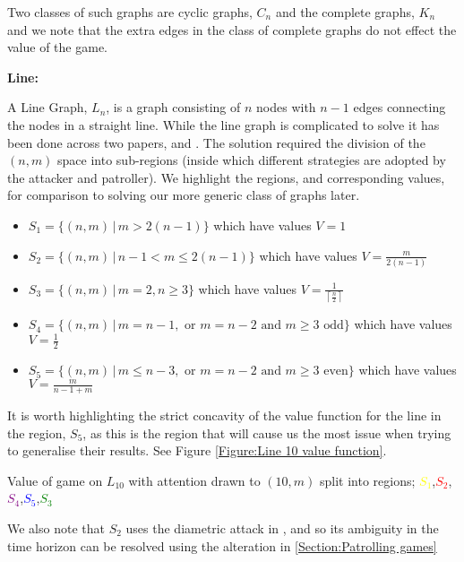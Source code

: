 \documentclass[a4paper,10pt]{article}
\newcommand{\ceil}[1]{\left \lceil #1 \right \rceil}
\theoremstyle{definition}
\theoremstyle{definition}
\theoremstyle{remark}
\theoremstyle{definition}
\begin{document}
Two classes of such graphs are cyclic graphs, $C_{n}$ and the complete graphs, $K_{n}$ and we note that the extra edges in the class of complete graphs do not effect the value of the game.

\textbf{Line:}

A Line Graph, $L_{n}$, is a graph consisting of $n$ nodes with $n-1$ edges connecting the nodes in a straight line.  While the line graph is complicated to solve it has been done across two papers, \cite{Alpern2011} and \cite{Papadaki2016}. The solution required the division of the $(n,m)$ space into sub-regions (inside which different strategies are adopted by the attacker and patroller). We highlight the regions, and corresponding values, for comparison to solving our more generic class of graphs later.

\begin{itemize}
\item $S_{1}= \{(n,m) \, | \, m > 2(n-1) \}$ which have values $V=1$
\item $S_{2}= \{(n,m) \, | \,  n-1 < m \leq 2(n-1) \}$ which have values $V=\frac{m}{2(n-1)}$
\item $S_{3}= \{(n,m) \, | \, m=2,n\geq 3 \}$ which have values $V=\frac{1}{\ceil{\frac{n}{2}}}$
\item $S_{4}= \{(n,m) \, | \, m=n-1, \text{ or } m=n-2 \text{ and } m \geq 3 \text{ odd} \}$ which have values $V=\frac{1}{2}$
\item $S_{5}= \{(n,m) \, | \, m \leq n-3, \text{ or } m=n-2 \text{ and } m \geq 3 \text{ even} \}$ which have values $V=\frac{m}{n-1+m}$
\end{itemize}

It is worth highlighting the strict concavity of the value function for the line in the region, $S_{5}$, as this is the region that will cause us the most issue when trying to generalise their results. See Figure \ref{Figure:Line 10 value function}.

\begin{myfigure}
\begin{center}

\end{center}
\caption{Value of game on $L_{10}$ with attention drawn to $(10,m)$ split into regions; \textcolor{yellow}{$S_{1}$},\textcolor{red}{$S_{2}$},\textcolor{purple}{$S_{4}$},\textcolor{blue}{$S_{5}$},\textcolor{green}{$S_{3}$}}
\label{Figure:Line 10 value function}
\end{myfigure}

We also note that $S_{2}$ uses the diametric attack in \cite{Papadaki2016}, and so its ambiguity in the time horizon can be resolved using the alteration in \ref{Section:Patrolling games}
\end{document}
